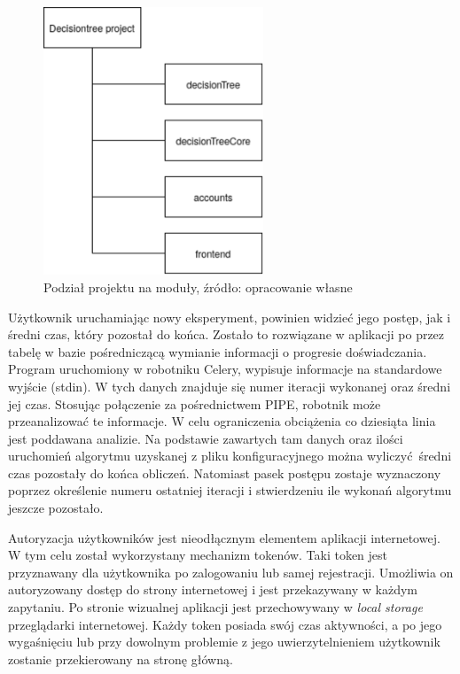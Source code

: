 \begin{figure}[htb]
	\centering
	\includegraphics[height=8cm]{grafika/packages.eps}
	\caption{Podział projektu na moduły, źródło: opracowanie własne}
	\label{rys4_packages}
\end{figure}
Użytkownik uruchamiając nowy eksperyment, powinien widzieć jego postęp, jak i średni czas, który pozostał do końca. Zostało to rozwiązane w aplikacji po przez tabelę w bazie pośredniczącą wymianie informacji o progresie doświadczania. Program uruchomiony w robotniku Celery, wypisuje informacje na standardowe wyjście (stdin). W tych danych znajduje się numer iteracji wykonanej oraz średni jej czas. Stosując połączenie za pośrednictwem PIPE, robotnik może przeanalizować te informacje. W celu ograniczenia obciążenia co dziesiąta linia jest poddawana analizie. Na podstawie zawartych tam danych oraz ilości uruchomień algorytmu uzyskanej z pliku konfiguracyjnego można wyliczyć średni czas pozostały do końca obliczeń. Natomiast pasek postępu zostaje wyznaczony poprzez określenie numeru ostatniej iteracji i stwierdzeniu ile wykonań algorytmu jeszcze pozostało. 

Autoryzacja użytkowników jest nieodłącznym elementem aplikacji internetowej. W tym celu został wykorzystany mechanizm tokenów. Taki token jest przyznawany dla użytkownika po zalogowaniu lub samej rejestracji. Umożliwia on autoryzowany dostęp do strony internetowej i jest przekazywany w każdym zapytaniu. Po stronie wizualnej aplikacji jest przechowywany w \textit{local storage} przeglądarki internetowej. Każdy token posiada swój czas aktywności, a po jego wygaśnięciu lub przy dowolnym problemie z jego uwierzytelnieniem użytkownik zostanie przekierowany na stronę główną. 


